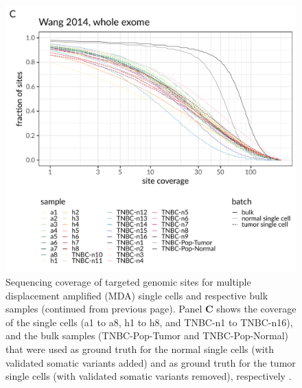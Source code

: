 \documentclass[authoryear,preprint,11pt]{scrartcl}
\begin{document}
\begin{figure}[!tpb]
 \ContinuedFloat
 \begin{minipage}{\linewidth}
  \includegraphics[width=\linewidth]{figs/Wang2014/Wang2014_coverage_dist.pdf}
 \end{minipage}
 \caption{
 Sequencing coverage of targeted genomic sites for multiple displacement amplified (MDA) single cells and respective bulk samples (continued from previous page).
 Panel \textbf{C} shows the coverage of the single cells (a1 to a8, h1 to h8, and TNBC-n1 to TNBC-n16), and the bulk samples (TNBC-Pop-Tumor and TNBC-Pop-Normal) that were used as ground truth for the normal single cells (with validated somatic variants added) and as ground truth for the tumor single cells (with validated somatic variants removed), respectively \cite{wang_clonal_2014}.
 }
\end{figure}
\end{document}

